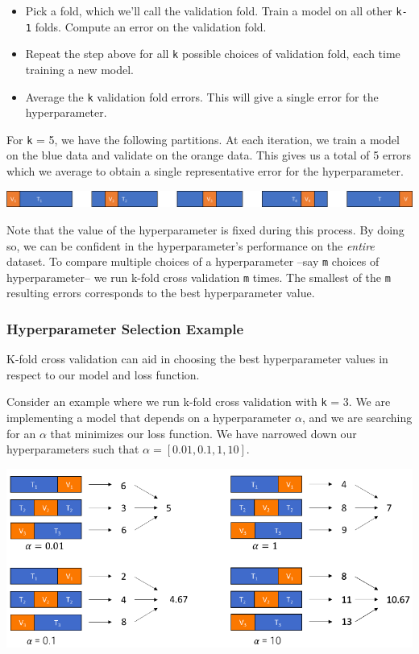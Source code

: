 \documentclass[
  letterpaper,
  DIV=11,
  numbers=noendperiod]{scrreprt}
\providecommand{\tightlist}{%
  \setlength{\itemsep}{0pt}\setlength{\parskip}{0pt}}\usepackage{longtable,booktabs,array}
\begin{document}
\begin{itemize}
\tightlist
\item
  Pick a fold, which we'll call the validation fold. Train a model on
  all other \texttt{k-1} folds. Compute an error on the validation fold.
\item
  Repeat the step above for all \texttt{k} possible choices of
  validation fold, each time training a new model.
\item
  Average the \texttt{k} validation fold errors. This will give a single
  error for the hyperparameter.
\end{itemize}

For \texttt{k} = 5, we have the following partitions. At each iteration,
we train a model on the blue data and validate on the orange data. This
gives us a total of 5 errors which we average to obtain a single
representative error for the hyperparameter.

\includegraphics{cv_regularization/images/kfold.png}

Note that the value of the hyperparameter is fixed during this process.
By doing so, we can be confident in the hyperparameter's performance on
the \emph{entire} dataset. To compare multiple choices of a
hyperparameter --say \texttt{m} choices of hyperparameter-- we run
k-fold cross validation \texttt{m} times. The smallest of the \texttt{m}
resulting errors corresponds to the best hyperparameter value.

\hypertarget{hyperparameter-selection-example}{%
\subsubsection{Hyperparameter Selection
Example}\label{hyperparameter-selection-example}}

K-fold cross validation can aid in choosing the best hyperparameter
values in respect to our model and loss function.

Consider an example where we run k-fold cross validation with \texttt{k}
= 3. We are implementing a model that depends on a hyperparameter
\(\alpha\), and we are searching for an \(\alpha\) that minimizes our
loss function. We have narrowed down our hyperparameters such that
\(\alpha = [0.01, 0.1, 1, 10]\).

\includegraphics{cv_regularization/images/cv_hyperparam_selection.png}
\end{document}
